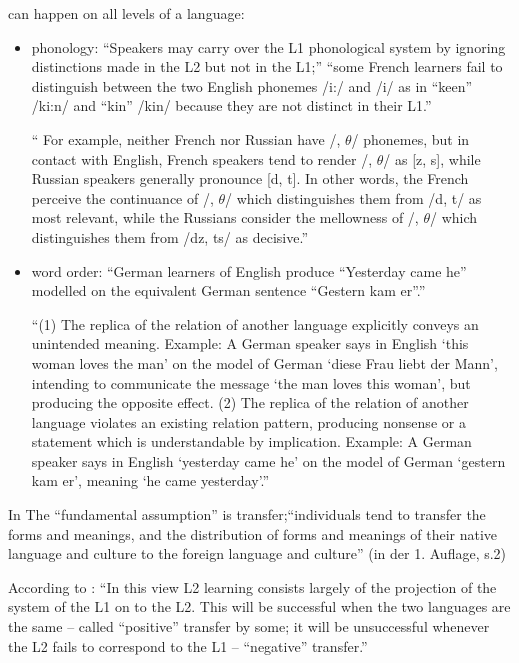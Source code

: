 can happen on all levels of a language:
\begin{itemize}
    \item phonology: ``Speakers may carry over the L1 phonological system by ignoring distinctions made in the L2 but not in the L1;'' \cite{Cook93}
        ``some French learners fail to distinguish between the two English phonemes /i:/ and /i/ as in ``keen'' /ki:n/ and ``kin'' /kin/ because they are not distinct in their L1.''

        \cite{Weinreich79} `` For example, neither French nor Russian have /, $\theta$/ phonemes, but in contact
        with English, French speakers tend to render /, $\theta$/ as [z, s], while Russian
        speakers generally pronounce [d, t].
        In other words, the French perceive the continuance of /, $\theta$/ which distinguishes them from /d, t/ as most relevant, while
        the Russians consider the mellowness of /, $\theta$/ which distinguishes them from /dz, ts/ as decisive.''


    \item word order: ``German learners of English produce ``Yesterday came he'' modelled on the equivalent German sentence ``Gestern kam er''.''

        \cite{Weinreich79} ``(1) The replica of the relation of another language explicitly conveys an unintended meaning. 
        Example: A German speaker says in English `this woman loves the man' on the model of German
        `diese Frau liebt der Mann', intending to communicate the message `the man
        loves this woman', but producing the opposite effect.
        (2) The replica of the relation of another language violates an existing relation pattern, producing
        nonsense or a statement which is understandable by implication.
        Example: A German speaker says in English `yesterday came he' on the model of German
        `gestern kam er', meaning `he came yesterday'.''


\end{itemize}

In \cite{Lado71} The ``fundamental assumption'' is transfer;``individuals tend to transfer the forms and meanings, and the distribution of forms and meanings of their native language and culture to the foreign language and culture'' (in der 1. Auflage, s.2)

According to \cite{Cook93}: ``In this view L2 learning consists largely of the projection of the system of the L1 on to the L2.
This will be successful when the two languages are the same -- called ``positive'' transfer by some;
it will be unsuccessful whenever the L2 fails to correspond to the L1 -- ``negative'' transfer.''

